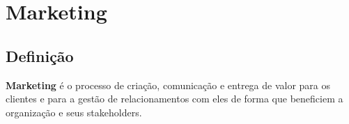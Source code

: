 \documentclass{article}
\begin{document}


\section{Marketing}

\subsection{Definição}
\textbf{Marketing} é o processo de criação, comunicação e entrega de valor para os clientes e para a gestão de relacionamentos com eles de forma que beneficiem a organização e seus stakeholders.
\end{document}
